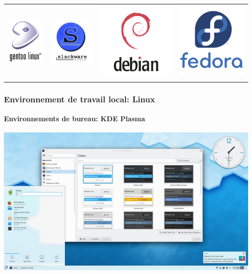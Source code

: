 \documentclass{beamer}
\begin{document}
\begin{frame}
\begin{tabular}{llll}
	\includegraphics[width=.2\textwidth]{..//img/Bweb01-environnement/gentoo-logo.png} & 
	\includegraphics[width=.2\textwidth]{..//img/Bweb01-environnement/slackware-logo.png} &
	\includegraphics[width=.2\textwidth]{..//img/Bweb01-environnement/debian-logo.png} & 
	\includegraphics[width=.2\textwidth]{..//img/Bweb01-environnement/fedora-logo.png} \\
	
\end{tabular}

\end{frame}

\begin{frame}
\frametitle{Environnement de travail local: Linux}
\framesubtitle{Environnements de bureau: KDE Plasma}

\begin{center}
	\includegraphics[height=
.8\textheight]{../img/Bweb01-environnement/kde.png}
\end{center}

\end{frame}
\end{document}
